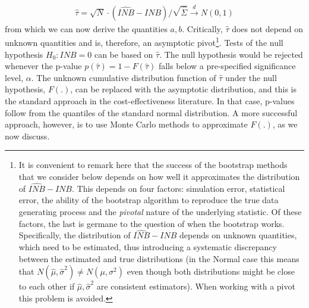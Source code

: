 \documentclass[english, 11pt,a4paper, ]{article}
\begin{document}
\begin{align}
	\hat{\tau}=\sqrt{N}\cdot (\widehat{INB}-INB)/\sqrt{\hat{\Sigma}} \xrightarrow{d}N(0,1)	
\end{align}
from which we can now derive the quantities $a,b$. Critically, $\hat{\tau}$ does not depend on unknown quantities and is, therefore, an asymptotic pivot\footnote{It is convenient to remark here that the success of the bootstrap methods that we consider below depends on how well it approximates the distribution of $ \widehat{INB}-INB $.
This depends on four factors: simulation error, statistical error, the ability of the bootstrap algorithm to reproduce the true data generating process and the \textit{pivotal} nature of the underlying statistic.
Of these factors, the last is germane to the question of when the bootstrap works. Specifically, the distribution of $ \widehat{INB}-INB $ depends on unknown quantities, which  need to be estimated,  thus introducing a systematic discrepancy between the
estimated and true distributions (in the Normal case this means that $ N(\hat{\mu}, \hat{\sigma}^2) \neq N(\mu, \sigma^2) $ even
though both distributions might be close to each other if $ \hat{\mu}, \hat{\sigma}^2 $ are consistent estimators). When working with a pivot this problem is avoided.}. Tests of the null hypothesis $H_0: INB =0$ can be based on $\hat{\tau}$. The null hypothesis would be rejected whenever the p-value $p(\hat{\tau})=1-F(\hat{\tau})$ falls below a pre-specified significance level, $\alpha$. The unknown cumulative distribution function of $\hat{\tau}$ under the null hypothesis, $F(.)$, can be replaced with the asymptotic distribution, and this is the standard approach in the cost-effectiveness literature. In that case, p-values follow from the quantiles of the standard normal distribution. A more successful approach, however, is to use Monte Carlo methods to approximate $F(.)$, as we now discuss.



\end{document}
